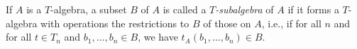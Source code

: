 If $A$ is a $T$-algebra, a subset $B$ of $A$ is called a \emph{$T$-subalgebra} of $A$ if it forms a $T$-algebra with operations the restrictions to $B$ of those on $A$, i.e., if for all $n$ and for all $t \in T_n$ and $b_1, \ldots, b_n \in B$, we have $t_A(b_1, \ldots, b_n) \in B$.
